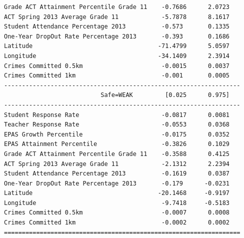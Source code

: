 \documentclass[11pt]{article}
\newcommand{\1}{\mathds{1}}
\begin{document}
\begin{Verbatim}[fontsize=\tiny]
Grade ACT Attainment Percentile Grade 11    -0.7686      2.0723
ACT Spring 2013 Average Grade 11            -5.7878      8.1617
Student Attendance Percentage 2013          -0.573       0.1335
One-Year DropOut Rate Percentage 2013       -0.393       0.1686
Latitude                                   -71.4799      5.0597
Longitude                                  -34.1409      2.3914
Crimes Committed 0.5km                      -0.0015      0.0037
Crimes Committed 1km                        -0.001       0.0005
------------------------------------------------------------------
                           Safe=WEAK         [0.025      0.975]         
------------------------------------------------------------------
Student Response Rate                       -0.0817      0.0081
Teacher Response Rate                       -0.0553      0.0368
EPAS Growth Percentile                      -0.0175      0.0352
EPAS Attainment Percentile                  -0.3826      0.1029
Grade ACT Attainment Percentile Grade 11    -0.3588      0.4125
ACT Spring 2013 Average Grade 11            -2.1312      2.2394
Student Attendance Percentage 2013          -0.1619      0.0387
One-Year DropOut Rate Percentage 2013       -0.179      -0.0231
Latitude                                   -20.1468     -0.9197
Longitude                                   -9.7418     -0.5183
Crimes Committed 0.5km                      -0.0007      0.0008
Crimes Committed 1km                        -0.0002      0.0002
==================================================================
\end{Verbatim}
\end{document}

